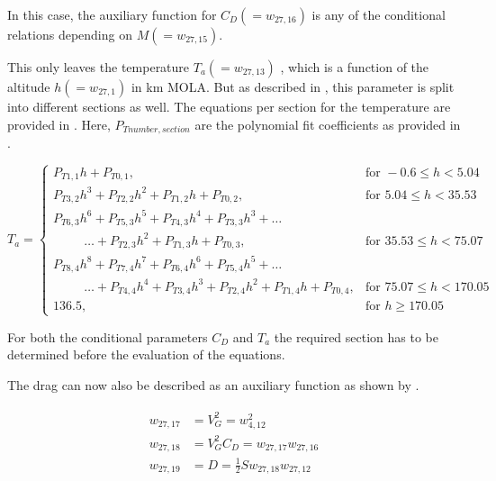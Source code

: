 \noindent
In this case, the auxiliary function for $C_{D} \left( = w_{27,16}\right)$ is any of the conditional relations depending on $M \left( = w_{27,15}\right)$.

\noindent
This only leaves the temperature $T_{a} \left(= w_{27,13}\right)$ , which is a function of the altitude $h \left(= w_{27,1} \right) $ in km \ac{MOLA}. But as described in , this parameter is split into different sections as well. The equations per section for the temperature are provided in . Here, $P_{T number,section}$ are the polynomial fit coefficients as provided in .

\begin{equation}\label{eq:tempCondAuxC}
T_{a}=\begin{cases}
P_{T 1,1}h+P_{T 0,1}, & \text{for } -0.6 \leq h < 5.04  \\
P_{T 3,2}h^{3}+P_{T 2,2}h^{2}+P_{T 1,2}h+P_{T 0,2}, &  \text{for } 5.04 \leq h < 35.53   \\
P_{T 6,3}h^{6}+P_{T 5,3}h^{5}+P_{T 4,3}h^{4}+P_{T 3,3}h^{3}+ \dotsc \\
\qquad\ \ \dotsc +P_{T 2,3}h^{2}+P_{T 1,3}h+P_{T 0,3}, &  \text{for } 35.53 \leq h < 75.07   \\
P_{T 8,4}h^{8}+P_{T 7,4}h^{7}+P_{T 6,4}h^{6}+P_{T 5,4}h^{5}+ \dotsc \\
\qquad\ \ \dotsc+P_{T 4,4}h^{4}+P_{T 3,4}h^{3}+P_{T 2,4}h^{2}+P_{T 1,4}h+P_{T 0,4}, &  \text{for } 75.07 \leq h < 170.05   \\
136.5, &  \text{for }  h \geq 170.05   
\end{cases}
\end{equation}

\noindent
For both the conditional parameters $C_{D}$ and $T_{a}$  the required section has to be determined before the evaluation of the equations.

\noindent
The drag can now also be described as an auxiliary function as shown by .

\begin{align} \label{eq:dragAuxF}
\begin{split}
w_{27,17} &= V_{G}^{2} =  w_{4,12}^{2} \\
w_{27,18} &= V_{G}^{2}C_{D} = w_{27,17}w_{27,16} \\
w_{27,19} &= D = \frac{1}{2} S w_{27,18}w_{27,12} \\
\end{split}
\end{align}



